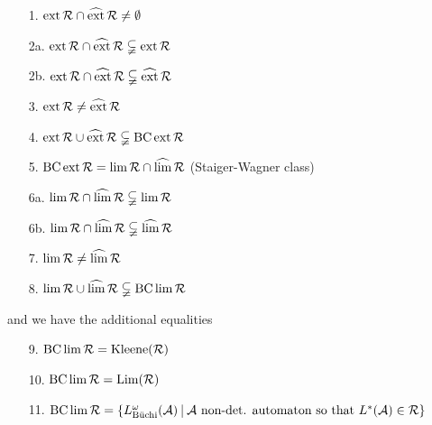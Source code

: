 \begin{lemma}
\label{P:reg-star}

\begin{enumerate}
\item[1.] $\operatorname{ext} \mathcal{R} \cap \operatorname{\widehat{ext}} \mathcal{R} \neq \emptyset$
\item[2a.] $\operatorname{ext} \mathcal{R} \cap \operatorname{\widehat{ext}} \mathcal{R} \subsetneqq \operatorname{ext} \mathcal{R}$
\item[2b.] $\operatorname{ext} \mathcal{R} \cap \operatorname{\widehat{ext}} \mathcal{R} \subsetneqq \operatorname{\widehat{ext}} \mathcal{R}$
\item[3.] $\operatorname{ext} \mathcal{R} \neq \operatorname{\widehat{ext}} \mathcal{R}$
\item[4.] $\operatorname{ext} \mathcal{R} \cup \operatorname{\widehat{ext}} \mathcal{R} \subsetneqq \operatorname{BC} \operatorname{ext} \mathcal{R}$
\item[5.] $\operatorname{BC} \operatorname{ext} \mathcal{R} = \lim \mathcal{R} \cap \operatorname{\widehat{lim}} \mathcal{R}$ (Staiger-Wagner class)
\item[6a.] $\lim \mathcal{R} \cap \operatorname{\widehat{lim}} \mathcal{R} \subsetneqq \lim \mathcal{R}$
\item[6b.] $\lim \mathcal{R} \cap \operatorname{\widehat{lim}} \mathcal{R} \subsetneqq \operatorname{\widehat{lim}} \mathcal{R}$
\item[7.] $\lim \mathcal{R} \neq \operatorname{\widehat{lim}} \mathcal{R}$
\item[8.] $\lim \mathcal{R} \cup \operatorname{\widehat{lim}} \mathcal{R} \subsetneqq \operatorname{BC} \lim \mathcal{R}$
\end{enumerate}
and we have the additional equalities
\begin{enumerate}
\item[9.] $\operatorname{BC} \lim \mathcal{R} = \operatorname{Kleene}(\mathcal{R})$
\item[10.] $\operatorname{BC} \lim \mathcal{R} = \operatorname{Lim}(\mathcal{R})$
\item[11.] $\BC \lim \mathcal{R} = \Set{L_{\text{Büchi}}^\omega(\A)}{\A \text{ non-det. automaton so that } L^*(\A) \in \mathcal{R}}$
\end{enumerate}


\end{lemma}
